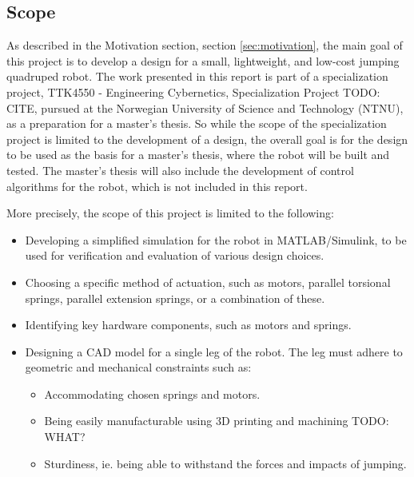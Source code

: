 \subsection{Scope}

As described in the Motivation section, section \ref{sec:motivation}, the main goal of this project is to develop a design for a small, lightweight, and low-cost jumping quadruped robot. The work presented in this report is part of a specialization project, TTK4550 - Engineering Cybernetics, Specialization Project TODO: CITE, pursued at the Norwegian University of Science and Technology (NTNU), as a preparation for a master's thesis. So while the scope of the specialization project is limited to the development of a design, the overall goal is for the design to be used as the basis for a master's thesis, where the robot will be built and tested. The master's thesis will also include the development of control algorithms for the robot, which is not included in this report.

More precisely, the scope of this project is limited to the following:
\begin{itemize}
    \item Developing a simplified simulation for the robot in MATLAB/Simulink, to be used for verification and evaluation of various design choices. 
    \item Choosing a specific method of actuation, such as motors, parallel torsional springs, parallel extension springs, or a combination of these.
    \item Identifying key hardware components, such as motors and springs. 
    \item Designing a CAD model for a single leg of the robot. The leg must adhere to geometric and mechanical constraints such as:
    \begin{itemize}
    \item Accommodating chosen springs and motors. 
    \item Being easily manufacturable using 3D printing and machining TODO: WHAT?
    \item Sturdiness, ie. being able to withstand the forces and impacts of jumping.
    \end{itemize}
\end{itemize}


\nocite{schulman_proximal_2017}  %

